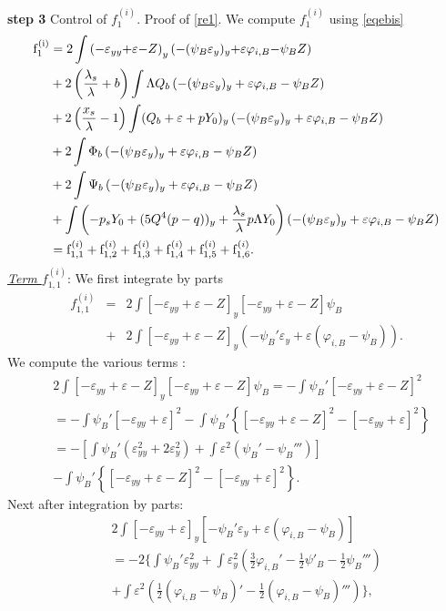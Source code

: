 \documentclass[11pt,a4paper,reqno]{amsart}
\theoremstyle{remark}
\numberwithin{equation}{section}
\newcommand{\bee}{\begin{eqnarray*}}
\newcommand{\eee}{\end{eqnarray*}}
\def\e{\varepsilon}
\def\lsl{\frac{\lambda_s}{\lambda}}
\def\lsl{\frac{\lambda_s}{\lambda}}
\def\zz{Z}
\def\Yz{Y_0}
\begin{document}
 
 {\bf step 3} Control of $f_1^{(i)}$. Proof of \eqref{re1}. 
 We compute 
$ f_{1}^{(i)} $
using \eqref{eqebis}
\begin{align*}
  \rm f_{1}^{(i)}& = 2 \int   \left(  -\varepsilon_{yy} {+} \varepsilon  {-}\zz  \right)_y \left(-(\psi_B\e_y)_y{+}\e\varphi_{i,B}{-}\psi_B\zz \right) 
\\ & +2\left(\frac {{\lambda}_{s}}{{\lambda}}+{b}\right) \int {\Lambda} Q_b  \left( - (\psi_B\varepsilon_y)_y + \varepsilon \varphi_{i,B}-\psi_B \zz   \right)
\\ &   + 2 \left(\frac { x_{{s}}}{\lambda} -1\right) \int (Q_b  + \varepsilon+p\Yz)_y
 \left( -(\psi_B \varepsilon_y)_y + \varepsilon \varphi_{i,B}-\psi_B\zz  \right)
 \\ & + 2 \int  \Phi_{{b}}  \left( -(\psi_B \varepsilon_y)_y + \varepsilon \varphi_{i,B}-\psi_B\zz   \right)
\\ & + 2 \int  \Psi_{{b}}   \left( -(\psi_B \varepsilon_y)_y + \varepsilon \varphi_{i,B}-\psi_B\zz  \right) \\
& + \int \left(-p_s\Yz +(5Q^4(p-q))_y + \lsl p \Lambda \Yz\right) \left( -(\psi_B \varepsilon_y)_y + \varepsilon \varphi_{i,B}-\psi_B\zz  \right) 
\\ & = {{\rm f}^{(i)}_{1,1}}+ {{\rm f}^{(i)}_{1,2}}+{{\rm f}^{(i)}_{1,3}}+{{\rm f}^{(i)}_{1,4}}+{{\rm f}^{(i)}_{1,5}}+{{\rm f}^{(i)}_{1,6}}.
\end{align*}
\underline{{\em Term $f^{(i)}_{1,1}$}}:  We first integrate by parts  
\bee
f^{(i)}_{1,1}& = &  2 \int\left[  -\varepsilon_{yy} + \varepsilon  -\zz  \right]_y\left[-\e_{yy}+ \varepsilon  -\zz\right] \psi_B \\
& + & 2\int\left[  -\varepsilon_{yy} + \varepsilon  -\zz\right]_y\left(-\psi_B'\e_y+\e(\varphi_{i,B}-\psi_B)\right). 
\eee
We compute the various terms  :
\begin{align*} & 2\int\left[  -\varepsilon_{yy} + \varepsilon  -\zz  \right]_y\left[-\e_{yy}+ \varepsilon  -\zz\right]\psi_B =-\int\psi_B'\left[-\e_{yy}+ \varepsilon  -\zz\right]^2\\
&  =-\int\psi_B'\left[-\e_{yy}+ \varepsilon \right]^2  - \int\psi_B'\left\{\left[-\e_{yy}+ \varepsilon  -\zz\right]^2-\left[-\e_{yy}+\e\right]^2\right\}\\
&   = -\left[\int\psi_B'(\e_{yy}^2+2\e_y^2)+\int\e^2(\psi_B'-\psi_B''')\right]\\
&  -\int\psi_B'\left\{\left[-\e_{yy}+ \varepsilon  -\zz\right]^2-\left[-\e_{yy}+\e\right]^2\right\}.
\end{align*}
Next after integration by parts:
\bee
& & 2 \int\left[  -\varepsilon_{yy} + \varepsilon\right]_y\left[-\psi_B'\e_y+\e(\varphi_{i,B}-\psi_B)\right]\\
&  &  =-2 \Big\{\int\psi_B'\e_{yy}^2+\int\e_y^2(\tfrac32\varphi_{i,B}'-\tfrac12\psi'_B-\tfrac12\psi_B''')\\&&+\int\e^2(\tfrac12(\varphi_{i,B}-\psi_B)'-\tfrac12(\varphi_{i,B}-\psi_B)''')\Big\},
\eee
\end{document}
